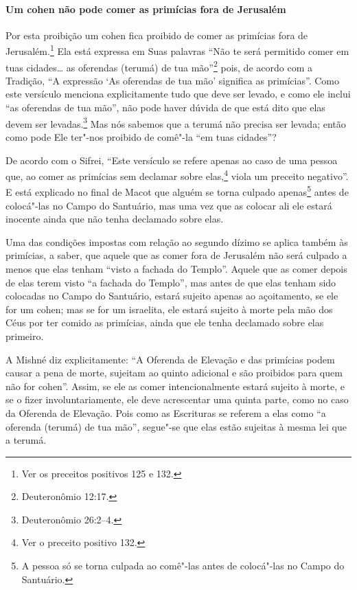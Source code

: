 \begin{multicols}{2}
\paragraph{Um cohen\starr{} não pode comer as primícias fora de Jerusalém}

Por esta proibição um cohen\starr{} fica proibido de comer as primícias fora
de Jerusalém.\footnote{Ver os preceitos positivos 125 e 132.} Ela está expressa em Suas palavras
``Não te será permitido comer em tuas cidades\ldots{} as oferendas (terumá\starr)
de tua mão''\footnote{Deuteronômio 12:17.} pois, de acordo com a Tradição, ``A
expressão `As oferendas de tua mão' significa as primícias''. Como este
versículo menciona explicitamente tudo que deve ser levado, e como ele
inclui ``as oferendas de tua mão'', não pode haver dúvida de que está
dito que elas devem ser levadas.\footnote{Deuteronômio 26:2--4.} Mas nós sabemos
que a terumá\starr{} não precisa ser levada; então como pode Ele ter"-nos
proibido de comê"-la ``em tuas cidades''?

De acordo com o Sifrei\starr, ``Este versículo se refere apenas ao caso de uma
pessoa que, ao comer as primícias sem declamar sobre
elas,\footnote{Ver o preceito positivo 132.} viola um preceito negativo''. E está
explicado no final de Macot\starr{} que alguém se torna culpado
apenas\footnote{A pessoa só se torna culpada ao comê"-las antes de colocá"-las no
Campo do Santuário.} antes de colocá"-las no Campo do Santuário,
mas uma vez que as colocar ali ele estará inocente ainda que não tenha
declamado sobre elas.

Uma das condições impostas com relação ao segundo dízimo se aplica
também às primícias, a saber, que aquele que as comer fora de Jerusalém
não será culpado a menos que elas tenham ``visto a fachada do Templo''.
Aquele que as comer depois de elas terem visto ``a fachada do Templo'',
mas antes de que elas tenham sido colocadas no Campo do Santuário,
estará sujeito apenas ao açoitamento, se ele for um cohen\starr; mas se
for um israelita, ele estará sujeito à morte pela mão dos Céus por ter
comido as primícias, ainda que ele tenha declamado sobre elas primeiro.

A Mishné diz explicitamente: ``A Oferenda de Elevação e das primícias
podem causar a pena de morte, sujeitam ao quinto adicional e são
proibidos para quem não for cohen\starr''. Assim, se ele as comer
intencionalmente estará sujeito à morte, e se o fizer
involuntariamente, ele deve acrescentar uma quinta parte, como no caso
da Oferenda de Elevação. Pois como as Escrituras se referem a elas como
``a oferenda (terumá\starr) de tua mão'', segue"-se que elas estão sujeitas à
mesma lei que a terumá\starr.


\end{multicols}
